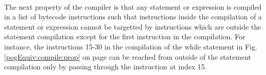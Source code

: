 \Qed\\


The next  property  of the compiler is that any statement or expression   is
 compiled in a list of bytecode instructions 
such that instructions inside the compilation of a statement or expression cannot be targetted by instructions 
 which are outside the statement compilation except for the first instruction in the compilation.
 For instance,  the instructions 15-30 in the compilation of the while statement
 in Fig. \ref{pogEquiv:compile:prop} on page \pageref{pogEquiv:compile:prop}
 can be reached from outside of the statement compilation only by passing through the instruction at index 15.

